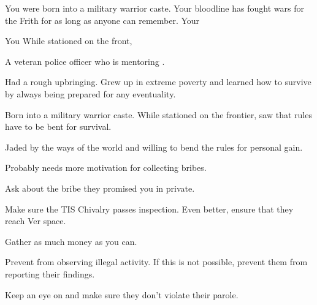 \documentclass[char]{guildcamp4}
\begin{document}
\name{\cCbad{}}

You were born into a military warrior caste. Your bloodline has fought wars for the Frith for as long as anyone can remember. Your 

You While stationed on the front, 

\begin{itemz}[Backstory]
    \item A veteran police officer who is mentoring \cCgood{}.
    \item Had a rough upbringing. Grew up in extreme poverty and learned how to survive by always being prepared for any eventuality.
    \item Born into a military warrior caste. While stationed on the frontier, saw that rules have to be bent for survival.
    \item Jaded by the ways of the world and willing to bend the rules for personal gain.
    \item Probably needs more motivation for collecting bribes.
\end{itemz}

\begin{itemz}[Goals]
	\item Ask \cVone{} about the bribe they promised you in private.
	\item Make sure the TIS Chivalry passes inspection. Even better, ensure that they reach Ver space.
	\item Gather as much money as you can.
	\item Prevent \cCgood{} from observing illegal activity. If this is not possible, prevent them from reporting their findings.
	\item Keep an eye on \cPilot{} and make sure they don't violate their parole. 
\end{itemz}

\begin{itemz}[Notes]
	\item 
\end{itemz}

\begin{contacts}
	\contact{\cTest{}}
\end{contacts}
\end{document}
